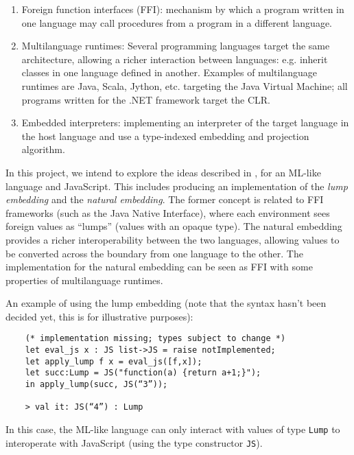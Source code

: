 \documentclass[12pt,a4paper]{article} \usepackage{a4wide}
\begin{document}
\begin{enumerate}

\item Foreign function interfaces (FFI): mechanism by which a program
  written in one language may call procedures from a program in a
  different language.

\item Multilanguage runtimes: Several programming languages target the
  same architecture, allowing a richer interaction between languages:
  e.g. inherit classes in one language defined in another. Examples of
  multilanguage runtimes are Java, Scala, Jython, etc. targeting the
  Java Virtual Machine; all programs written for the .NET framework
  target the CLR.

\item Embedded interpreters: implementing an interpreter of the target
  language in the host language and use a type-indexed embedding and
  projection algorithm.

\end{enumerate}

In this project, we intend to explore the ideas described in
\cite{journals/toplas/MatthewsF09}, for an ML-like language and
JavaScript. This includes producing an implementation of the
\emph{lump embedding} and the \emph{natural embedding}. The former
concept is related to FFI frameworks (such as the Java Native
Interface), where each environment sees foreign values as ``lumps''
(values with an opaque type). The natural embedding provides a richer
interoperability between the two languages, allowing values to be
converted across the boundary from one language to the other. The
implementation for the natural embedding can be seen as FFI with some
properties of multilanguage runtimes.

An example of using the lump embedding (note that the syntax hasn't
been decided yet, this is for illustrative purposes):

\begin{verbatim}
    (* implementation missing; types subject to change *)
    let eval_js x : JS list->JS = raise notImplemented;
    let apply_lump f x = eval_js([f,x]);
    let succ:Lump = JS("function(a) {return a+1;}");
    in apply_lump(succ, JS(“3”));

    > val it: JS(“4”) : Lump
\end{verbatim}

In this case, the ML-like language can only interact with values of
type \texttt{Lump} to interoperate with JavaScript (using the type constructor
\texttt{JS}).
\end{document}
